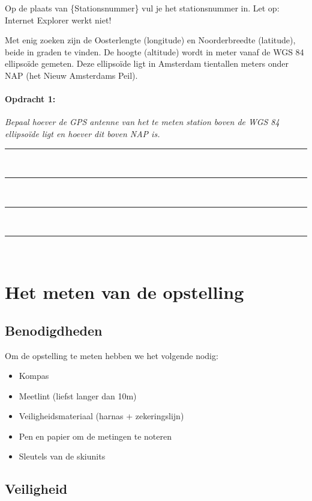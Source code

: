 Op de plaats van \{Stationsnummer\} vul je het stationsnummer in. Let
op: Internet Explorer werkt niet! 

Met enig zoeken zijn de Oosterlengte (longitude) en Noorderbreedte
(latitude), beide in graden te vinden. De hoogte (altitude) wordt in
meter vanaf de WGS 84 ellipsoïde gemeten. Deze ellipsoïde ligt in
Amsterdam tientallen meters onder NAP (het Nieuw Amsterdams Peil).

\begin{minipage}[t]{1\columnwidth}%

\paragraph{Opdracht 1:}

\textit{Bepaal hoever de GPS antenne van het te meten station boven
        de WGS 84 ellipsoïde ligt en hoever dit boven NAP is.}

\begin{center}
    \rule{\textwidth}{0.3mm}\\
    \rule{\textwidth}{0.3mm}\\
    \rule{\textwidth}{0.3mm}\\
    \rule{\textwidth}{0.3mm}\\
\end{center}
\end{minipage}


\section{Het meten van de opstelling}


\subsection{Benodigdheden}

Om de opstelling te meten hebben we het volgende nodig:

\begin{itemize}
    \item Kompas
    \item Meetlint (liefst langer dan 10m)
    \item Veiligheidsmateriaal (harnas + zekeringslijn)
    \item Pen en papier om de metingen te noteren
    \item Sleutels van de skiunits
\end{itemize}

\subsection{Veiligheid}

